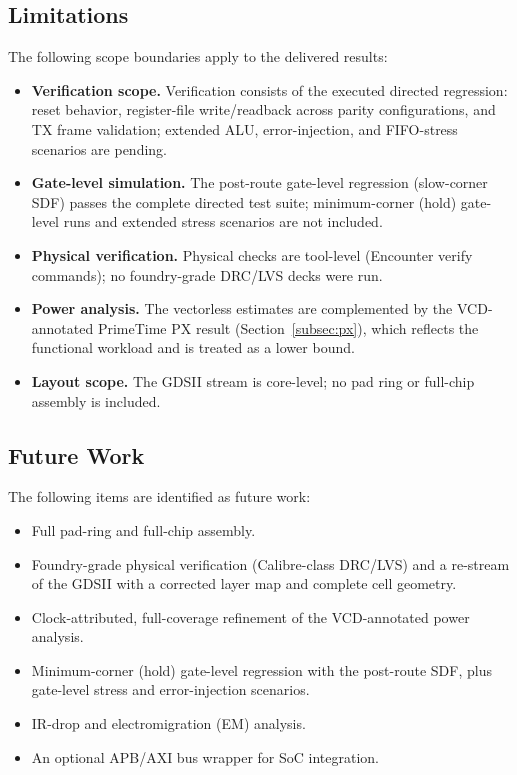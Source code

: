 \documentclass[11pt,a4paper]{article}
\begin{document}
\subsection{Limitations}

The following scope boundaries apply to the delivered results:
\begin{itemize}
    \item \textbf{Verification scope.} Verification consists of the executed directed regression: reset behavior, register-file write/readback across parity configurations, and TX frame validation; extended ALU, error-injection, and FIFO-stress scenarios are pending.
    \item \textbf{Gate-level simulation.} The post-route gate-level regression (slow-corner SDF) passes the complete directed test suite; minimum-corner (hold) gate-level runs and extended stress scenarios are not included.
    \item \textbf{Physical verification.} Physical checks are tool-level (Encounter verify commands); no foundry-grade DRC/LVS decks were run.
    \item \textbf{Power analysis.} The vectorless estimates are complemented by the VCD-annotated PrimeTime PX result (Section~\ref{subsec:px}), which reflects the functional workload and is treated as a lower bound.
    \item \textbf{Layout scope.} The GDSII stream is core-level; no pad ring or full-chip assembly is included.
\end{itemize}

\subsection{Future Work}

The following items are identified as future work:
\begin{itemize}
    \item Full pad-ring and full-chip assembly.
    \item Foundry-grade physical verification (Calibre-class DRC/LVS) and a re-stream of the GDSII with a corrected layer map and complete cell geometry.
    \item Clock-attributed, full-coverage refinement of the VCD-annotated power analysis.
    \item Minimum-corner (hold) gate-level regression with the post-route SDF, plus gate-level stress and error-injection scenarios.
    \item IR-drop and electromigration (EM) analysis.
    \item An optional APB/AXI bus wrapper for SoC integration.
\end{itemize}
\end{document}
